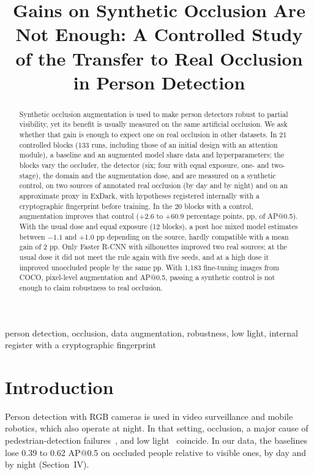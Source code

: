 \documentclass[conference]{IEEEtran}
\begin{document}
\title{Gains on Synthetic Occlusion Are Not Enough: A Controlled Study of the Transfer to Real Occlusion in Person Detection}

\author{
}

\maketitle

\begin{abstract}
Synthetic occlusion augmentation is used to make person detectors robust to partial visibility, yet its benefit is usually measured on the same artificial occlusion. We ask whether that gain is enough to expect one on real occlusion in other datasets. In 21 controlled blocks (133 runs, including those of an initial design with an attention module), a baseline and an augmented model share data and hyperparameters; the blocks vary the occluder, the detector (six; four with equal exposure, one- and two-stage), the domain and the augmentation dose, and are measured on a synthetic control, on two sources of annotated real occlusion (by day and by night) and on an approximate proxy in ExDark, with hypotheses registered internally with a cryptographic fingerprint before training. In the 20 blocks with a control, augmentation improves that control (+2.6 to +60.9 percentage points, pp, of AP@0.5). With the usual dose and equal exposure (12 blocks), a post hoc mixed model estimates between $-1.1$ and +1.0 pp depending on the source, hardly compatible with a mean gain of 2 pp. Only Faster R-CNN with silhouettes improved two real sources; at the usual dose it did not meet the rule again with five seeds, and at a high dose it improved unoccluded people by the same pp. With 1,183 fine-tuning images from COCO, pixel-level augmentation and AP@0.5, passing a synthetic control is not enough to claim robustness to real occlusion.
\end{abstract}

\begin{IEEEkeywords}
person detection, occlusion, data augmentation, robustness, low light, internal register with a cryptographic fingerprint
\end{IEEEkeywords}

\section{Introduction}
Person detection with RGB cameras is used in video surveillance and mobile robotics, which also operate at night. In that setting, occlusion, a major cause of pedestrian-detection failures~\cite{Dollar2012}, and low light~\cite{Loh2019} coincide. In our data, the baselines lose 0.39 to 0.62 AP@0.5 on occluded people relative to visible ones, by day and by night (Section~IV).
\end{document}
